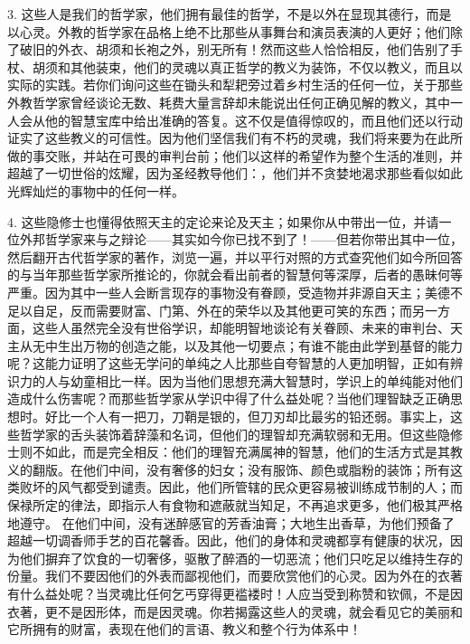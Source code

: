 3. 这些人是我们的哲学家，他们拥有最佳的哲学，不是以外在显现其德行，而是以心灵。外教的哲学家在品格上绝不比那些从事舞台和演员表演的人更好；他们除了破旧的外衣、胡须和长袍之外，别无所有！然而这些人恰恰相反，他们告别了手杖、胡须和其他装束，他们的灵魂以真正哲学的教义为装饰，不仅以教义，而且以实际的实践。若你们询问这些在锄头和犁耙旁过着乡村生活的任何一位，关于那些外教哲学家曾经谈论无数、耗费大量言辞却未能说出任何正确见解的教义，其中一人会从他的智慧宝库中给出准确的答复。这不仅是值得惊叹的，而且他们还以行动证实了这些教义的可信性。因为他们坚信我们有不朽的灵魂，我们将来要为在此所做的事交账，并站在可畏的审判台前；他们以这样的希望作为整个生活的准则，并超越了一切世俗的炫耀，因为圣经教导他们：，他们并不贪婪地渴求那些看似如此光辉灿烂的事物中的任何一样。\par

4. 这些隐修士也懂得依照天主的定论来论及天主；如果你从中带出一位，并请一位外邦哲学家来与之辩论——其实如今你已找不到了！——但若你带出其中一位，然后翻开古代哲学家的著作，浏览一遍，并以平行对照的方式查究他们如今所回答的与当年那些哲学家所推论的，你就会看出前者的智慧何等深厚，后者的愚昧何等严重。因为其中一些人会断言现存的事物没有眷顾，受造物并非源自天主；美德不足以自足，反而需要财富、门第、外在的荣华以及其他更可笑的东西；而另一方面，这些人虽然完全没有世俗学识，却能明智地谈论有关眷顾、未来的审判台、天主从无中生出万物的创造之能，以及其他一切要点；有谁不能由此学到基督的能力呢？这能力证明了这些无学问的单纯之人比那些自夸智慧的人更加明智，正如有辨识力的人与幼童相比一样。因为当他们思想充满大智慧时，学识上的单纯能对他们造成什么伤害呢？而那些哲学家从学识中得了什么益处呢？当他们理智缺乏正确思想时。好比一个人有一把刀，刀鞘是银的，但刀刃却比最劣的铅还弱。事实上，这些哲学家的舌头装饰着辞藻和名词，但他们的理智却充满软弱和无用。但这些隐修士则不如此，而是完全相反：他们的理智充满属神的智慧，他们的生活方式是其教义的翻版。在他们中间，没有奢侈的妇女；没有服饰、颜色或脂粉的装饰；所有这类败坏的风气都受到谴责。因此，他们所管辖的民众更容易被训练成节制的人；而保禄所定的律法，即指示人有食物和遮蔽就当知足，不再追求更多，他们极其严格地遵守。 在他们中间，没有迷醉感官的芳香油膏；大地生出香草，为他们预备了超越一切调香师手艺的百花馨香。因此，他们的身体和灵魂都享有健康的状况，因为他们摒弃了饮食的一切奢侈，驱散了醉酒的一切恶流；他们只吃足以维持生存的份量。我们不要因他们的外表而鄙视他们，而要欣赏他们的心灵。因为外在的衣著有什么益处呢？当灵魂比任何乞丐穿得更褴褛时！人应当受到称赞和钦佩，不是因衣著，更不是因形体，而是因灵魂。你若揭露这些人的灵魂，就会看见它的美丽和它所拥有的财富，表现在他们的言语、教义和整个行为体系中！\par


